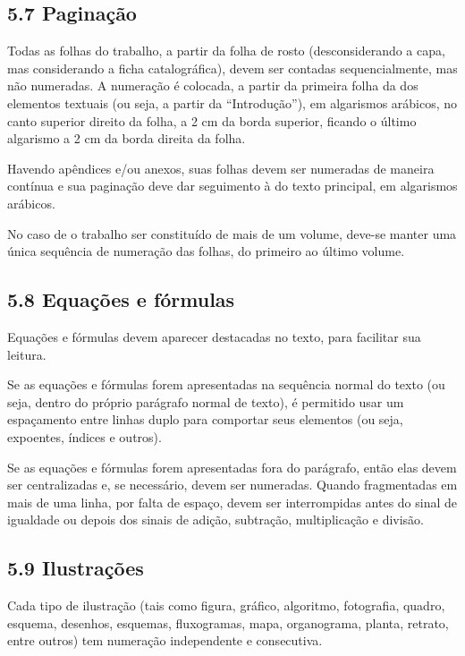 \documentclass[
	12pt,				%
	oneside,			%
	a4paper,			%
	english,			%
	brazil				%
	]{abntex2ppgsi}
\begin{document}
\begin{anexosenv}
\subsection*{5.7 Paginação}

Todas as folhas do trabalho, a partir da folha de rosto (desconsiderando a capa, mas considerando a ficha catalográfica), devem ser contadas sequencialmente, mas não numeradas. A numeração é colocada, a partir da primeira folha da dos elementos textuais (ou seja, a partir da ``Introdução''), em algarismos arábicos, no canto superior direito da folha, a 2 cm da borda superior, ficando o último algarismo a 2 cm da borda direita da folha.

Havendo apêndices e/ou anexos, suas folhas devem ser numeradas de maneira contínua e sua paginação deve dar seguimento à do texto principal, em algarismos arábicos.

No caso de o trabalho ser constituído de mais de um volume, deve-se manter uma única sequência de numeração das folhas, do primeiro ao último volume.

\subsection*{5.8 Equações e fórmulas}

Equações e fórmulas devem aparecer destacadas no texto, para facilitar sua leitura. 

Se as equações e fórmulas forem apresentadas na sequência normal do texto (ou seja, dentro do próprio parágrafo normal de texto), é permitido usar um espaçamento entre linhas duplo para comportar seus elementos (ou seja, expoentes, índices e outros). 

Se as equações e fórmulas forem apresentadas fora do parágrafo, então elas devem ser centralizadas e, se necessário, devem ser numeradas. Quando fragmentadas em mais de uma linha, por falta de espaço, devem ser interrompidas antes do sinal de igualdade ou depois dos sinais de adição, subtração, multiplicação e divisão.

\subsection*{5.9 Ilustrações}

Cada tipo de ilustração (tais como figura, gráfico, algoritmo, fotografia, quadro, esquema, desenhos, esquemas, fluxogramas, mapa, organograma, planta, retrato, entre outros) tem numeração independente e consecutiva. 


\end{anexosenv}
\end{document}
